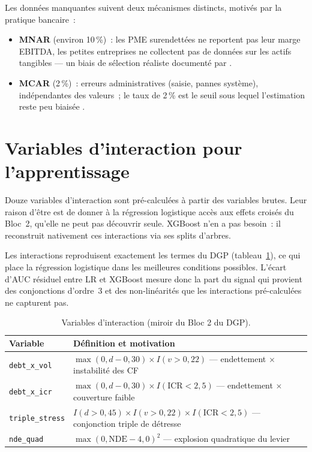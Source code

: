 \documentclass[12pt, a4paper, twoside, openright]{report}
\theoremstyle{definition}
\begin{document}
Les données manquantes suivent deux mécanismes distincts, motivés par la pratique bancaire~:
\begin{itemize}[nosep]
  \item \textbf{MNAR} (environ 10\,\%)~: les PME surendettées ne reportent pas leur marge EBITDA, les petites entreprises ne collectent pas de données sur les actifs tangibles --- un biais de sélection réaliste documenté par \citet{siddiqi2006}.
  \item \textbf{MCAR} (2\,\%)~: erreurs administratives (saisie, pannes système), indépendantes des valeurs~; le taux de 2\,\% est le seuil sous lequel l'estimation reste peu biaisée \citep{hosmer_lemeshow2013}.
\end{itemize}


\section{Variables d'interaction pour l'apprentissage}
\label{sec:donnees:interactions}

Douze variables d'interaction sont pré-calculées à partir des variables brutes.
Leur raison d'être est de donner à la régression logistique accès aux effets croisés du Bloc~2, qu'elle ne peut pas découvrir seule.
XGBoost n'en a pas besoin~: il reconstruit nativement ces interactions via ses splits d'arbres.

Les interactions reproduisent exactement les termes du DGP (tableau~\ref{tab:interactions}), ce qui place la régression logistique dans les meilleures conditions possibles.
L'écart d'AUC résiduel entre LR et XGBoost mesure donc la part du signal qui provient des conjonctions d'ordre~3 et des non-linéarités que les interactions pré-calculées ne capturent pas.

\begin{table}[htbp]
\centering
\caption{Variables d'interaction (miroir du Bloc 2 du DGP).}
\label{tab:interactions}
\begin{tabular}{lp{7cm}}
\toprule
Variable & Définition et motivation \\
\midrule
\texttt{debt\_x\_vol}         & $\max(0, d - 0{,}30) \times I(v > 0{,}22)$ --- endettement $\times$ instabilité des CF \\
\texttt{debt\_x\_icr}         & $\max(0, d - 0{,}30) \times I(\text{ICR} < 2{,}5)$ --- endettement $\times$ couverture faible \\
\texttt{triple\_stress}       & $I(d > 0{,}45) \times I(v > 0{,}22) \times I(\text{ICR} < 2{,}5)$ --- conjonction triple de détresse \\
\texttt{nde\_quad}            & $\max(0, \text{NDE} - 4{,}0)^2$ --- explosion quadratique du levier \\
\bottomrule
\end{tabular}
\end{table}
\end{document}
